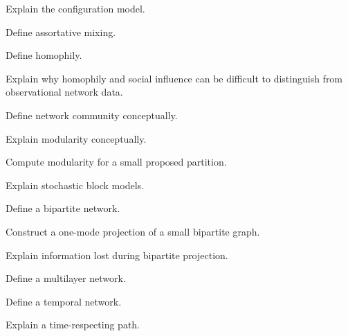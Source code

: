 \begin{exercise}[2]
Explain the configuration model.
\end{exercise}

\begin{exercise}[2]
Define assortative mixing.
\end{exercise}

\begin{exercise}[2]
Define homophily.
\end{exercise}

\begin{exercise}[3]
Explain why homophily and social influence can be difficult to distinguish
from observational network data.
\end{exercise}

\begin{exercise}[2]
Define network community conceptually.
\end{exercise}

\begin{exercise}[2]
Explain modularity conceptually.
\end{exercise}

\begin{exercise}[3]
Compute modularity for a small proposed partition.
\end{exercise}

\begin{exercise}[3]
Explain stochastic block models.
\end{exercise}

\begin{exercise}[2]
Define a bipartite network.
\end{exercise}

\begin{exercise}[3]
Construct a one-mode projection of a small bipartite graph.
\end{exercise}

\begin{exercise}[3]
Explain information lost during bipartite projection.
\end{exercise}

\begin{exercise}[2]
Define a multilayer network.
\end{exercise}

\begin{exercise}[2]
Define a temporal network.
\end{exercise}

\begin{exercise}[3]
Explain a time-respecting path.
\end{exercise}

